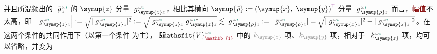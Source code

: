 并且所混频出的 $\Xint{{}^{}_{\mathcolor{gray}{-}}}{10}{\bar{g}}^{\;\!\mathcolor{gray}{\omega} \textcolor{PineGreen}{\imath}}_{\;\! \mathcolor{gray}{z}}$ 的 $\symup{z}$ 分量 $\Xint{{}^{}_{\mathcolor{gray}{-}}}{10}{g}^{\;\!\mathcolor{gray}{\omega} \textcolor{PineGreen}{\imath}}_{\;\! \symup{z} \mathcolor{gray}{z}}$，相比其横向 $\symup{\bar{\rho}} := \left( \symup{x},~ \symup{y} \right)^{\mathsf{\textcolor{Plum}{T}}}$ 分量 $\Xint{{}^{}_{\mathcolor{gray}{-}}}{10}{\bar{g}}^{\;\!\mathcolor{gray}{\omega} \textcolor{PineGreen}{\imath}}_{\;\! \symup{\rho} \mathcolor{gray}{z}}$ 而言，\textcolor{Maroon}{幅值}不太高，即 $\left| \Xint{{}^{}_{\mathcolor{gray}{-}}}{10}{g}^{\;\!\mathcolor{gray}{\omega} \textcolor{PineGreen}{\imath}}_{\;\! \symup{z} \mathcolor{gray}{z}} \right| := \sqrt{ \lvert \Xint{{}^{}_{\mathcolor{gray}{-}}}{10}{g}^{\;\!\mathcolor{gray}{\omega} \textcolor{PineGreen}{\imath}}_{\;\! \symup{z} \mathcolor{gray}{z}} \rvert^2 } := \sqrt{ \Xint{{}^{}_{\mathcolor{gray}{-}}}{10}{g}^{\;\!\mathcolor{gray}{\omega} \textcolor{PineGreen}{\imath}}_{\;\! \symup{z} \mathcolor{gray}{z}} \Xint{{}^{}_{\mathcolor{gray}{-}}}{10}{g}^{\;\!\mathcolor{gray}{\omega} \textcolor{PineGreen}{\imath} *}_{\;\! \symup{z} \mathcolor{gray}{z}} } \lesssim \Xint{{}^{}_{\mathcolor{gray}{-}}}{10}{g}^{\;\!\mathcolor{gray}{\omega} \textcolor{PineGreen}{\imath}}_{\;\! \symup{\rho} \mathcolor{gray}{z}} := \lvert \Xint{{}^{}_{\mathcolor{gray}{-}}}{10}{\bar{g}}^{\;\!\mathcolor{gray}{\omega} \textcolor{PineGreen}{\imath}}_{\;\! \symup{\rho} \mathcolor{gray}{z}} \rvert = \sqrt{ \lvert \Xint{{}^{}_{\mathcolor{gray}{-}}}{10}{g}^{\;\! \mathcolor{gray}{\omega} \textcolor{PineGreen}{\imath}}_{\;\! \symup{x} \mathcolor{gray}{z}} \rvert^2 + \lvert \Xint{{}^{}_{\mathcolor{gray}{-}}}{10}{g}^{\;\! \mathcolor{gray}{\omega} \textcolor{PineGreen}{\imath}}_{\;\! \symup{x} \mathcolor{gray}{z}} \rvert^2 }$。在这两个条件的共同作用下（以第一个条件  为主）， 即 $\Xint{\mathcolor{gray}{-}}{25}{\bar{\bar{\mathsfit{V}}}}^{\;\! \mathcolor{gray}{\omega} \textcolor{PineGreen}{\imath}}_{\textcolor{Maroon}{\mathbb{1}}}$ 中的 $\mathcolor{gray}{k_{\symup{x}}}$ 项、$\mathcolor{gray}{k_{\symup{y}}}$ 项，相对于 $\Xint{\begin{smallmatrix} ~ \\ {}^{}_{\mathcolor{gray}{-}} \\ ~ \end{smallmatrix}}{15}{k}_{\symup{z}}^{\;\! \mathcolor{gray}{\omega} \textcolor{PineGreen}{\imath}}$ 项，均可以省略，并变为
